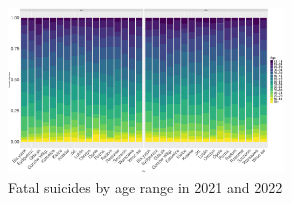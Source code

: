 \documentclass{article}
\begin{document}
\begin{figure}[H]
    \centering
    \includegraphics[width=0.65\textwidth]{imgs/age_city_fat_op-2122.pdf}
    \caption{Fatal suicides by age range in 2021 and 2022}
    \label{fig:age_city_fat_op-2122}
\end{figure}
\end{document}
